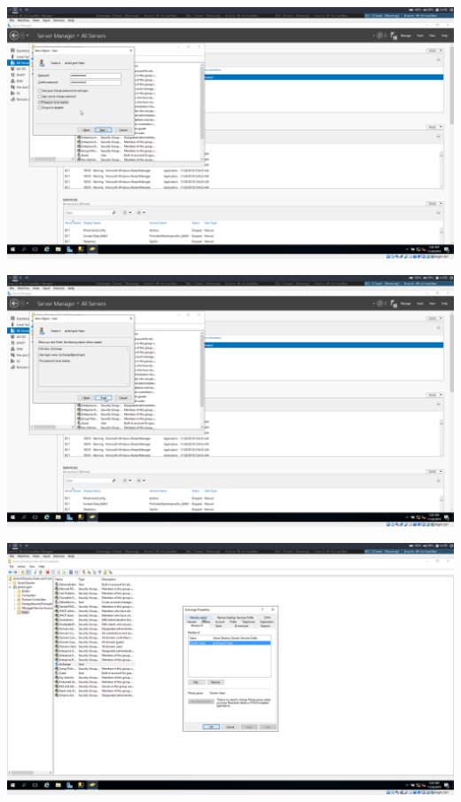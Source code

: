 \documentclass[a4paper]{article}
\begin{document}
	\begin{center}
	\includegraphics[width=15cm]{Pictures/Exchange/user/1543413379.png}
\end{center}
	\begin{center}
	\includegraphics[width=15cm]{Pictures/Exchange/user/1543413382.png}
\end{center}
	\begin{center}
	\includegraphics[width=15cm]{Pictures/Exchange/user/1543413392.png}
\end{center}
\end{document}
